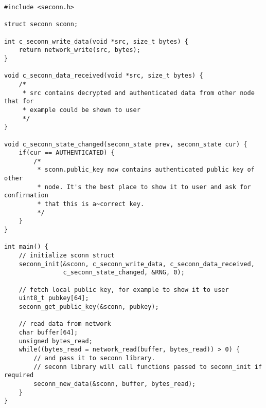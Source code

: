 \label{tab:sample-usage}
\begin{lstlisting}
#include <seconn.h>

struct seconn sconn;

int c_seconn_write_data(void *src, size_t bytes) {
    return network_write(src, bytes);
}

void c_seconn_data_received(void *src, size_t bytes) {
    /*
     * src contains decrypted and authenticated data from other node that for
     * example could be shown to user
     */
}

void c_seconn_state_changed(seconn_state prev, seconn_state cur) {
    if(cur == AUTHENTICATED) {
        /*
         * sconn.public_key now contains authenticated public key of other
         * node. It's the best place to show it to user and ask for confirmation
         * that this is a~correct key.
         */
    }
}

int main() {
    // initialize sconn struct
    seconn_init(&sconn, c_seconn_write_data, c_seconn_data_received,
                c_seconn_state_changed, &RNG, 0);

    // fetch local public key, for example to show it to user
    uint8_t pubkey[64];
    seconn_get_public_key(&sconn, pubkey);

    // read data from network
    char buffer[64];
    unsigned bytes_read;
    while((bytes_read = network_read(buffer, bytes_read)) > 0) {
        // and pass it to seconn library.
        // seconn library will call functions passed to seconn_init if required
        seconn_new_data(&sconn, buffer, bytes_read);
    }
}
\end{lstlisting}
\FloatBarrier

\addtocounter{section}{1}

